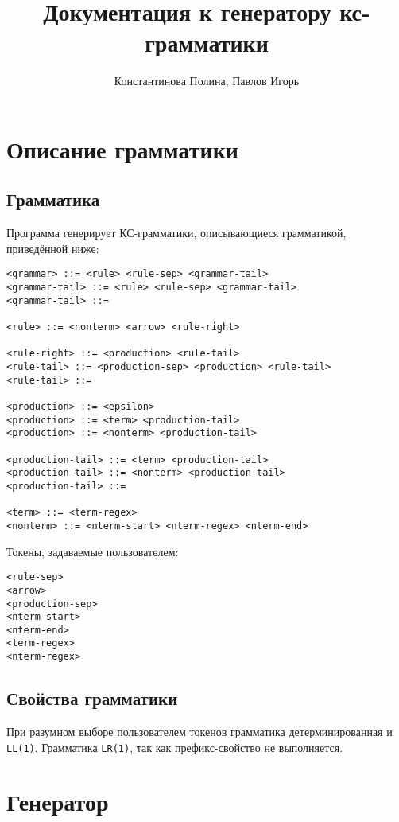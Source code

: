 \documentclass{article}
\title{Документация к генератору кс-грамматики}
\author{Константинова Полина, Павлов Игорь}
\begin{document}
\maketitle

\newpage
\tableofcontents

\newpage

\section{Описание грамматики}
\subsection{Грамматика}
\qquad Программа генерирует КС-грамматики, описывающиеся грамматикой, приведённой ниже:
\begin{lstlisting}
<grammar> ::= <rule> <rule-sep> <grammar-tail>
<grammar-tail> ::= <rule> <rule-sep> <grammar-tail>
<grammar-tail> ::=

<rule> ::= <nonterm> <arrow> <rule-right>

<rule-right> ::= <production> <rule-tail>
<rule-tail> ::= <production-sep> <production> <rule-tail>
<rule-tail> ::=

<production> ::= <epsilon>
<production> ::= <term> <production-tail>
<production> ::= <nonterm> <production-tail>

<production-tail> ::= <term> <production-tail>
<production-tail> ::= <nonterm> <production-tail>
<production-tail> ::=

<term> ::= <term-regex>
<nonterm> ::= <nterm-start> <nterm-regex> <nterm-end>
\end{lstlisting}

Токены, задаваемые пользователем:

\begin{lstlisting}
<rule-sep>
<arrow>
<production-sep>
<nterm-start>
<nterm-end>
<term-regex>
<nterm-regex>
\end{lstlisting}

\subsection{Свойства грамматики}
\justifying
\qquad При разумном выборе пользователем токенов грамматика детерминированная и \verb|LL(1)|. Грамматика \verb|LR(1)|, так как префикс-свойство не выполняется.

\section{Генератор}
\end{document}
